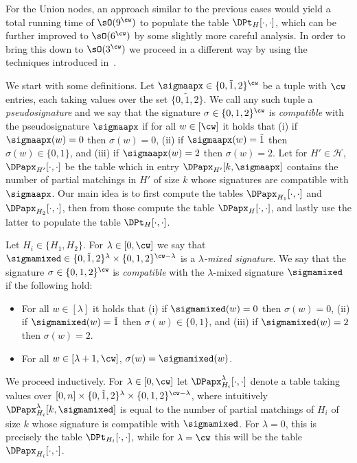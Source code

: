 For the Union nodes, an approach similar to the previous cases would yield a total running time of $\sO(9^{\cw})$
to populate the table $\DPt_H[\cdot,\cdot]$, which can be further improved to $\sO(6^{\cw})$ by some slightly more
careful analysis.
In order to bring this down to $\sO(3^{\cw})$ we proceed in a different way
by using the techniques introduced in~\cite{mfcs/BodlaenderLRV10,tcs/CyganP10,esa/RooijBR09}.

We start with some definitions.
Let $\sigmaapx \in \{0,\tilde{1},2\}^{\cw}$ be a tuple with $\cw$ entries,
each taking values over the set $\{0,\tilde{1},2\}$.
We call any such tuple a \emph{pseudosignature} and we say that the signature $\sigma \in \{0,1,2\}^{\cw}$
is \emph{compatible} with the pseudosignature $\sigmaapx$ if for all $w \in [\cw]$ it holds that
(i) if $\sigmaapx(w) = 0$ then $\sigma(w) = 0$,
(ii) if $\sigmaapx(w) = \tilde{1}$ then $\sigma(w) \in \{0,1\}$, and
(iii) if $\sigmaapx(w) = 2$ then $\sigma(w) = 2$.
Let for $H' \in \mathcal{H}$, $\DPapx_{H'}[\cdot,\cdot]$ be the table
which in entry $\DPapx_{H'}[k,\sigmaapx]$ contains the number of partial matchings
in $H'$ of size $k$ whose signatures are compatible with $\sigmaapx$.
Our main idea is to first compute the tables $\DPapx_{H_1}[\cdot,\cdot]$ and $\DPapx_{H_2}[\cdot,\cdot]$,
then from those compute the table $\DPapx_H[\cdot,\cdot]$,
and lastly use the latter to populate the table $\DPt_H[\cdot,\cdot]$.


Let $H_i \in \{H_1,H_2\}$.
For $\lambda \in [0,\cw]$ we say that $\sigmamixed \in \{0,\tilde{1},2\}^{\lambda} \times \{0,1,2\}^{\cw-\lambda}$ is
a \emph{$\lambda$-mixed signature}.
We say that the signature $\sigma \in \{0,1,2\}^{\cw}$ is \emph{compatible} with the $\lambda$-mixed signature $\sigmamixed$
if the following hold:
\begin{itemize}
    \item For all $w \in [\lambda]$ it holds that
        (i) if $\sigmamixed(w) = 0$ then $\sigma(w) = 0$,
        (ii) if $\sigmamixed(w) = \tilde{1}$ then $\sigma(w) \in \{0,1\}$, and
        (iii) if $\sigmamixed(w) = 2$ then $\sigma(w) = 2$.

    \item For all $w \in [\lambda+1,\cw]$, $\sigma(w) = \sigmamixed(w)$.
\end{itemize}
We proceed inductively.
For $\lambda \in [0,\cw]$ let $\DPapx_{H_i}^{\lambda}[\cdot,\cdot]$ denote a table taking values over
$[0,n] \times \{0,\tilde{1},2\}^{\lambda} \times \{0,1,2\}^{\cw-\lambda}$,
where intuitively $\DPapx_{H_i}^{\lambda}[k,\sigmamixed]$ is equal to the number of partial matchings of ${H_i}$ of size $k$
whose signature is compatible with $\sigmamixed$.
For $\lambda=0$, this is precisely the table $\DPt_{H_i}[\cdot,\cdot]$,
while for $\lambda=\cw$ this will be the table $\DPapx_{H_i}[\cdot,\cdot]$.

